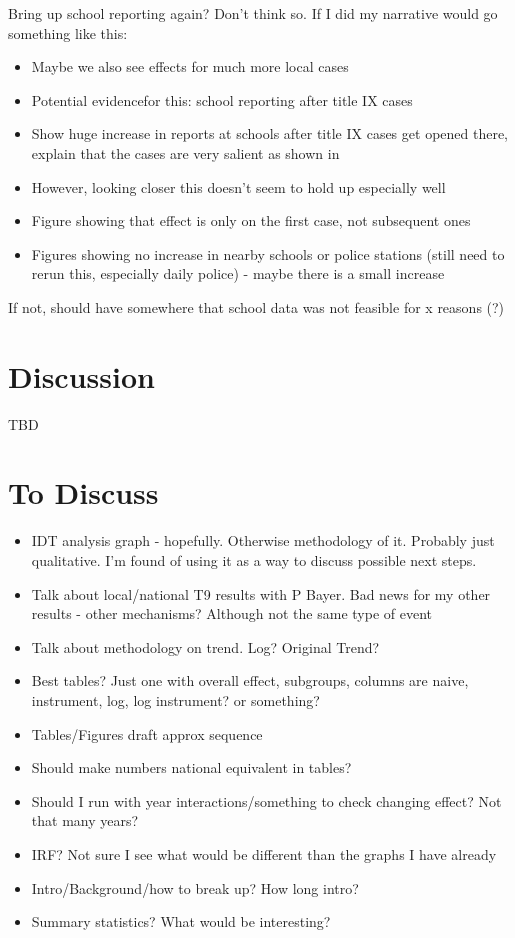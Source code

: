 \documentclass[AER,draftmode]{AEA}
\begin{document}
Bring up school reporting again? Don't think so. If I did my narrative would go something like this:
\begin{itemize}
    \item Maybe we also see effects for much more local cases
    \item Potential evidencefor this: school reporting after title IX cases
    \item Show huge increase in reports at schools after title IX cases get opened there, explain that the cases are very salient as shown in 
    \item However, looking closer this doesn't seem to hold up especially well
    \item Figure showing that effect is only on the first case, not subsequent ones
    \item Figures showing no increase in nearby schools or police stations (still need to rerun this, especially daily police) - maybe there is a small increase
\end{itemize}
If not, should have somewhere that school data was not feasible for x reasons (?)
\section{Discussion}

TBD

\clearpage
\section{To Discuss}

\begin{itemize}
    \item IDT analysis graph - hopefully. Otherwise methodology of it. Probably just qualitative. I'm found of using it as a way to discuss possible next steps.
    \item Talk about local/national T9 results with P Bayer. Bad news for my other results - other mechanisms? Although not the same type of event
    \item Talk about methodology on trend. Log? Original Trend?
    \item Best tables? Just one with overall effect, subgroups, columns are naive, instrument, log, log instrument? or something?
    \item Tables/Figures draft approx sequence
    \item Should make numbers national equivalent in tables? 
    \item Should I run with year interactions/something to check changing effect? Not that many years?
    \item IRF? Not sure I see what would be different than the graphs I have already
    \item Intro/Background/how to break up? How long intro?
    \item Summary statistics? What would be interesting?
\end{itemize}
\end{document}

